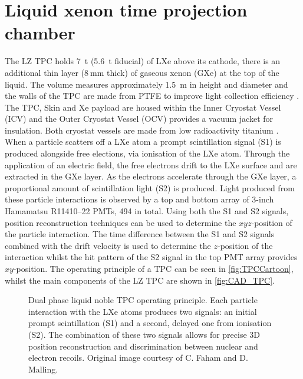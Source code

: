\section{Liquid xenon time projection chamber}\label{sec:LZ/LXeTPC}
The LZ TPC holds 7~t (5.6~t fiducial) of LXe above its cathode, there is an additional thin layer ($8~\text{mm}$ thick) of gaseous xenon (GXe) at the top of the liquid. The volume measures approximately 1.5~m in height and diameter and the walls of the TPC are made from PTFE to improve light collection efficiency \cite{LZNIMA}. The TPC, Skin and Xe payload are housed within the Inner Cryostat Vessel (ICV) and the Outer Cryostat Vessel (OCV) provides a vacuum jacket for insulation. Both cryostat vessels are made from low radioactivity titanium \cite{LZ:2017iwn}. When a particle scatters off a LXe atom a prompt scintillation signal (S1) is produced alongside free elections, via ionisation of the LXe atom. Through the application of an electric field, the free electrons drift to the LXe surface and are extracted in the GXe layer. As the electrons accelerate through the GXe layer, a proportional amount of scintillation light (S2) is produced. Light produced from these particle interactions is observed by a top and bottom array of 3-inch Hamamatsu R11410–22 PMTs, 494 in total. Using both the S1 and S2 signals, position reconstruction techniques can be used to determine the $xyz$-position of the particle interaction. The time difference between the S1 and S2 signals combined with the drift velocity is used to determine the $z$-position of the interaction whilst the hit pattern of the S2 signal in the top PMT array provides $xy$-position. The operating principle of a TPC can be seen in \autoref{fig:TPCCartoon}, whilst the main components of the LZ TPC are shown in \autoref{fig:CAD_TPC}.
\begin{figure}[ht!]
    \centering
    
    \caption{Dual phase liquid noble TPC operating principle. Each particle interaction with the LXe atoms produces two signals: an initial prompt scintillation (S1) and a second, delayed one from ionisation (S2). The combination of these two signals allows for precise 3D position reconstruction and discrimination between nuclear and electron recoils. Original image courtesy of C. Faham and D. Malling.}
    \label{fig:TPCCartoon}
\end{figure}

